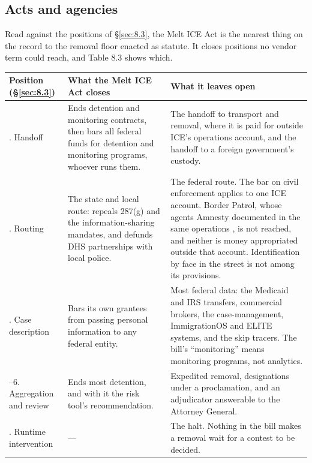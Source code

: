 \subsection{Acts and agencies}
\label{sec:8.4.2}
Read against the positions of \S\ref{sec:8.3}, the Melt ICE Act is the nearest thing on the record to the removal floor enacted as statute. It closes positions no vendor term could reach, and Table 8.3 shows which.


\begingroup\small\renewcommand{\arraystretch}{1.12}
\begin{longtable}{@{}>{\raggedright\arraybackslash}p{}>{\raggedright\arraybackslash}p{}>{\raggedright\arraybackslash}p{}@{}}
\hline
\textbf{Position (\S\ref{sec:8.3})} & \textbf{What the Melt ICE Act closes} & \textbf{What it leaves open} \\
\hline
\endhead
8. Handoff & Ends detention and monitoring contracts, then bars all federal funds for detention and monitoring programs, whoever runs them. & The handoff to transport and removal, where it is paid for outside ICE's operations account, and the handoff to a foreign government's custody. \\ \hline
2. Routing & The state and local route: repeals 287(g) and the information-sharing mandates, and defunds DHS partnerships with local police. & The federal route. The bar on civil enforcement applies to one ICE account. Border Patrol, whose agents Amnesty documented in the same operations \autocite{Amnesty2026Whistles}, is not reached, and neither is money appropriated outside that account. Identification by face in the street is not among its provisions. \\ \hline
3. Case description & Bars its own grantees from passing personal information to any federal entity. & Most federal data: the Medicaid and IRS transfers, commercial brokers, the case-management, ImmigrationOS and ELITE systems, and the skip tracers. The bill's “monitoring” means monitoring programs, not analytics. \\ \hline
5–6. Aggregation and review & Ends most detention, and with it the risk tool's recommendation. & Expedited removal, designations under a proclamation, and an adjudicator answerable to the Attorney General. \\ \hline
9. Runtime intervention & — & The halt. Nothing in the bill makes a removal wait for a contest to be decided. \\ \hline
\end{longtable}
\endgroup


